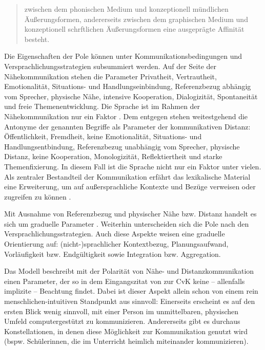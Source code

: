 \begin{quote}
zwischen dem phonischen Medium und konzeptionell mündlichen Äußerungsformen, andererseits zwischen dem graphischen Medium und konzeptionell schrftlichen Äußerungsformen eine ausgeprägte Affinität besteht. \citep[587]{koch_schriftlichkeit_1994}
\end{quote}

Die Eigenschaften der Pole können unter Kommunikationsbedingungen und Versprachlichungsstrategien subsummiert werden. Auf der Seite der Nähekommunikation stehen die Parameter Privatheit, Vertrautheit, Emotionalität, Si\-tu\-ati\-ons- und Handlungseinbindung, Referenzbezug abhängig vom Sprecher, physische Nähe, intensive Kooperation, Dialogizität, Spontaneität und freie Themenentwicklung. Die Sprache ist im Rahmen der Nähekommunikation nur ein Faktor \citep[591]{koch_schriftlichkeit_1994}. Dem entgegen stehen weitestgehend die Antonyme der genannten Begriffe als Parameter der kommunikativen Distanz: Öffentlichkeit, Fremdheit, keine Emotionalität, Situations- und Handlungsentbindung, Referenzbezug unabhängig vom Sprecher, physische Distanz, keine Kooperation, Monologizität, Reflektiertheit und starke Themenfixierung. In diesem Fall ist die Sprache nicht nur ein Faktor unter vielen. Als zentraler Bestandteil der Kommunikation erfährt das lexikalische Material eine Erweiterung, um auf außersprachliche Kontexte und Bezüge verweisen oder zugreifen zu können \citep[591]{koch_schriftlichkeit_1994}.

Mit Ausnahme von Referenzbezug und physischer Nähe bzw. Distanz handelt es sich um graduelle Parameter \citep[7]{koch_gesprochene_2011}. Weiterhin unterscheiden sich die Pole nach den Versprachlichungsstrategien. Auch diese Aspekte weisen eine graduelle Orientierung auf: (nicht-)sprachlicher Kontextbezug, Planungsaufwand, Vorläufigkeit bzw. Endgültigkeit sowie Integration bzw. Aggregation.

Das Modell beschreibt mit der Polarität von Nähe- und Distanzkommunikation einen Parameter, der so in dem Eingangszitat von \citeauthor{trepte_medienpsychologie_2012} zur CvK keine -- allenfalls implizite -- Beachtung findet. Dabei ist dieser Aspekt allein schon von einem rein menschlichen-intuitiven Standpunkt aus sinnvoll: Einerseits erscheint es auf den ersten Blick wenig sinnvoll, mit einer Person im unmittelbaren, physischen Umfeld computergestützt zu kommunizieren. Andererseits gibt es durchaus Konstellationen, in denen diese Möglichkeit zur Kommunikation genutzt wird (bspw. Schüler{\textperiodcentered}innen, die im Unterricht heimlich miteinander kommunizieren).

